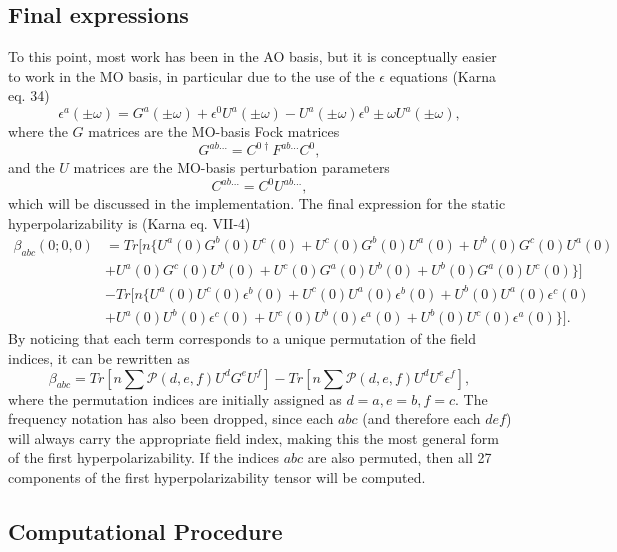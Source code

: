 \hypertarget{final-expressions}{%
  \subsection{Final expressions}\label{final-expressions}}

To this point, most work has been in the AO basis, but it is conceptually easier to work in the MO basis, in particular due to the use of the \(\epsilon\) equations (Karna eq. 34)
\[
  \epsilon^{a}(\pm\omega) = G^{a}(\pm\omega) + \epsilon^{0} U^{a}(\pm\omega) - U^{a}(\pm\omega) \epsilon^{0} \pm \omega U^{a}(\pm\omega),
\]
where the \(G\) matrices are the MO-basis Fock matrices
\[
  G^{ab\dots} = C^{0\dagger} F^{ab\dots} C^{0},
\]
and the \(U\) matrices are the MO-basis perturbation parameters
\[
  C^{ab\dots} = C^{0} U^{ab\dots},
\]
which will be discussed in the implementation. The final expression for the static hyperpolarizability is (Karna eq. VII-4)
\begin{equation}
  \begin{split}
    \beta_{abc}(0; 0, 0) &= Tr[n \{U^{a}(0) G^{b}(0) U^{c}(0) + U^{c}(0) G^{b}(0) U^{a}(0) + U^{b}(0) G^{c}(0) U^{a}(0) \\
    &+ U^{a}(0) G^{c}(0) U^{b}(0) + U^{c}(0) G^{a}(0) U^{b}(0) + U^{b}(0) G^{a}(0) U^{c}(0)\} ] \\
    &- Tr[n \{ U^{a}(0) U^{c}(0) \epsilon^{b}(0) + U^{c}(0) U^{a}(0) \epsilon^{b}(0) + U^{b}(0) U^{a}(0) \epsilon^{c}(0) \\
    &+ U^{a}(0) U^{b}(0) \epsilon^{c}(0) + U^{c}(0) U^{b}(0) \epsilon^{a}(0) + U^{b}(0) U^{c}(0) \epsilon^{a}(0) \} ].
  \end{split}
\end{equation}
By noticing that each term corresponds to a unique permutation of the field indices, it can be rewritten as
\[
  \beta_{abc} = Tr\left[ n \sum \mathcal{P}(d,e,f) U^{d} G^{e} U^{f} \right] - Tr\left[ n \sum \mathcal{P}(d,e,f) U^{d} U^{e} \epsilon^{f} \right],
\]
where the permutation indices are initially assigned as \(d = a, e = b, f = c\). The frequency notation has also been dropped, since each \(abc\) (and therefore each \(def\)) will always carry the appropriate field index, making this the most general form of the first hyperpolarizability. If the indices \(abc\) are also permuted, then all 27 components of the first hyperpolarizability tensor will be computed.

\hypertarget{computational-procedure}{%
  \subsection{Computational Procedure}\label{computational-procedure}}

